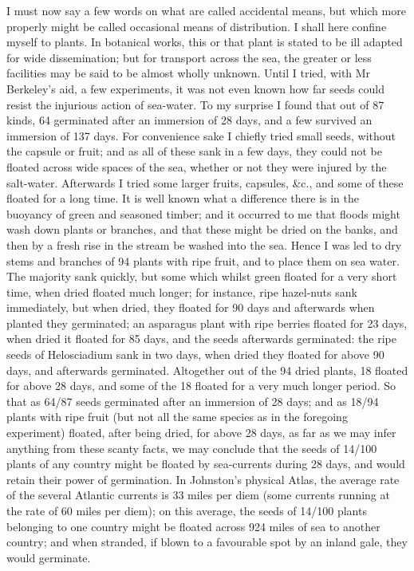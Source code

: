 \indent I must now say a few words on what are called accidental means, but which more properly might be called occasional means of distribution. I shall here confine myself to plants. In botanical works, this or that plant is stated to be ill adapted for wide dissemination; but for transport across the sea, the greater or less facilities may be said to be almost wholly unknown. Until I tried, with Mr Berkeley's aid, a few experiments, it was not even known how far seeds could resist the injurious action of sea-water. To my surprise I found that out of 87 kinds, 64 germinated after an immersion of 28 days, and a few survived an immersion of 137 days. For convenience sake I chiefly tried small seeds, without the capsule or fruit; and as all of these sank in a few days, they could not be floated across wide spaces of the sea, whether or not they were injured by the salt-water. Afterwards I tried some larger fruits, capsules, \&c., and some of these floated for a long time. It is well known what a difference there is in the buoyancy of green and seasoned timber; and it occurred to me that floods might wash down plants or branches, and that these might be dried on the banks, and then by a fresh rise in the stream be washed into the sea. Hence I was led to dry stems and branches of 94 plants with ripe fruit, and to place them on sea water. The majority sank quickly, but some which whilst green floated for a very short time, when dried floated much longer; for instance, ripe hazel-nuts sank immediately, but when dried, they floated for 90 days and afterwards when planted they germinated; an asparagus plant with ripe berries floated for 23 days, when dried it floated for 85 days, and the seeds afterwards germinated: the ripe seeds of Helosciadium sank in two days, when dried they floated for above 90 days, and afterwards germinated. Altogether out of the 94 dried plants, 18 floated for above 28 days, and some of the 18 floated for a very much longer period.  So that as 64/87 seeds germinated after an immersion of 28 days; and as 18/94 plants with ripe fruit (but not all the same species as in the foregoing experiment) floated, after being dried, for above 28 days, as far as we may infer anything from these scanty facts, we may conclude that the seeds of 14/100 plants of any country might be floated by sea-currents during 28 days, and would retain their power of germination. In Johnston's physical Atlas, the average rate of the several Atlantic currents is 33 miles per diem (some currents running at the rate of 60 miles per diem); on this average, the seeds of 14/100 plants belonging to one country might be floated across 924 miles of sea to another country; and when stranded, if blown to a favourable spot by an inland gale, they would germinate.~\\
